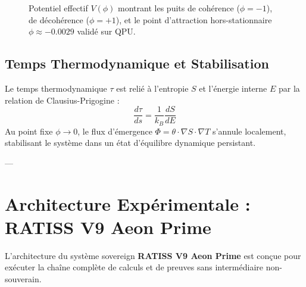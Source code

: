 \documentclass[12pt,a4paper]{article}
\begin{document}
\begin{figure}[H]
\centering
{}
\caption{Potentiel effectif $V(\phi)$ montrant les puits de cohérence ($\phi=-1$), de décohérence ($\phi=+1$), et le point d'attraction hors-stationnaire $\phi \approx -0.0029$ validé sur QPU.}
\label{fig:potential}
\end{figure}

\subsection{Temps Thermodynamique et Stabilisation}

Le temps thermodynamique $\tau$ est relié à l'entropie $S$ et l'énergie interne $E$ par la relation de Clausius-Prigogine :
\begin{equation}
\frac{d\tau}{ds} = \frac{1}{k_B} \frac{dS}{dE}
\end{equation}
Au point fixe $\phi \to 0$, le flux d'émergence $\Phi = \theta \cdot \nabla S \cdot \nabla T$ s'annule localement, stabilisant le système dans un état d'équilibre dynamique persistant.

---

\section{Architecture Expérimentale : RATISS V9 Aeon Prime}

L'architecture du système sovereign \textbf{RATISS V9 Aeon Prime} est conçue pour exécuter la chaîne complète de calculs et de preuves sans intermédiaire non-souverain.
\end{document}

